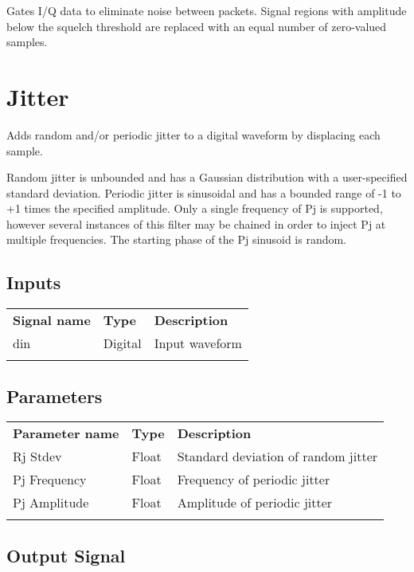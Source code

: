 Gates I/Q data to eliminate noise between packets. Signal regions with amplitude below the squelch threshold are
replaced with an equal number of zero-valued samples.

\pagebreak
\section{Jitter}
\label{filter:jitter}

Adds random and/or periodic jitter to a digital waveform by displacing each sample.

Random jitter is unbounded and has a Gaussian distribution with a user-specified standard deviation. Periodic jitter is
sinusoidal and has a bounded range of -1 to +1 times the specified amplitude. Only a single frequency of Pj is
supported, however several instances of this filter may be chained in order to inject Pj at multiple frequencies. The
starting phase of the Pj sinusoid is random.

\subsection{Inputs}

\begin{tabularx}{16cm}{llX}
\thickhline
\textbf{Signal name} & \textbf{Type} & \textbf{Description} \\
\thickhline
din & Digital & Input waveform\\
\thickhline
\end{tabularx}

\subsection{Parameters}

\begin{tabularx}{16cm}{llX}
\thickhline
\textbf{Parameter name} & \textbf{Type} & \textbf{Description} \\
\thickhline
Rj Stdev & Float & Standard deviation of random jitter\\
\thinhline
Pj Frequency & Float & Frequency of periodic jitter\\
\thinhline
Pj Amplitude & Float & Amplitude of periodic jitter\\
\thickhline
\end{tabularx}

\subsection{Output Signal}

